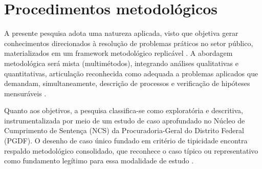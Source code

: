 
\section{Procedimentos metodológicos}

A presente pesquisa adota uma natureza aplicada, visto que objetiva gerar
conhecimentos direcionados à resolução de problemas práticos no setor público,
materializados em um framework metodológico replicável \parencite{gil2017}. A
abordagem metodológica será mista (multimétodos), integrando análises
qualitativas e quantitativas, articulação reconhecida como adequada a
problemas aplicados que demandam, simultaneamente, descrição de processos e
verificação de hipóteses mensuráveis \parencite{creswell2018}.

Quanto aos objetivos, a pesquisa classifica-se como exploratória e descritiva,
instrumentalizada por meio de um estudo de caso aprofundado no Núcleo de
Cumprimento de Sentença (NCS) da Procuradoria-Geral do Distrito Federal
(PGDF). O desenho de caso único fundado em critério de tipicidade encontra
respaldo metodológico consolidado, que reconhece o caso típico ou
representativo como fundamento legítimo para essa modalidade de estudo
\parencite{yin2015}.

